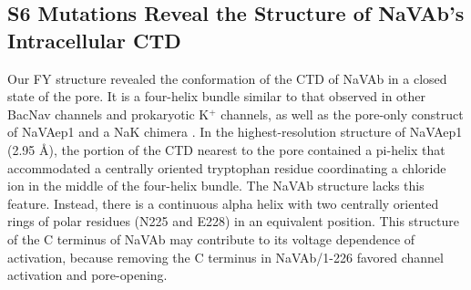 \begin{refsection}
{\subsection{S6 Mutations Reveal the Structure of NaVAb's Intracellular CTD}
Our FY structure revealed the conformation of the CTD of NaVAb in a closed state of the pore. It is a four-helix bundle similar to that observed in other BacNav channels and prokaryotic K$^+$ channels, as well as the pore-only construct of NaVAep1 and a NaK chimera \cite{Irie:2012dn,Arrigoni:2016fs}. In the highest-resolution structure of NaVAep1 (2.95 \AA), the portion of the CTD nearest to the pore contained a pi-helix that accommodated a centrally oriented tryptophan residue coordinating a chloride ion in the middle of the four-helix bundle. The NaVAb structure lacks this feature. Instead, there is a continuous alpha helix with two centrally oriented rings of polar residues (N225 and E228) in an equivalent position. This structure of the C terminus of NaVAb may contribute to its voltage dependence of activation, because removing the C terminus in NaVAb/1-226 favored channel activation and pore-opening.

}
\end{refsection}
